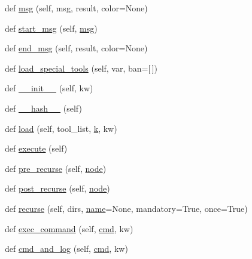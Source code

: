 \begin{DoxyCompactItemize}
def \hyperlink{classwaflib_1_1_context_1_1_context_a7495a2e04e528aa54bda3cadf08240cb}{msg} (self, msg, result, color=None)
\item 
def \hyperlink{classwaflib_1_1_context_1_1_context_a344a0dff2c7b0d2d76057d55b83c3f16}{start\+\_\+msg} (self, \hyperlink{classwaflib_1_1_context_1_1_context_a7495a2e04e528aa54bda3cadf08240cb}{msg})
\item 
def \hyperlink{classwaflib_1_1_context_1_1_context_a6340799a7fa4dc1230d13b7c08eec789}{end\+\_\+msg} (self, result, color=None)
\item 
def \hyperlink{classwaflib_1_1_context_1_1_context_a95a53e6c363450df77f847bec6c56696}{load\+\_\+special\+\_\+tools} (self, var, ban=\mbox{[}$\,$\mbox{]})
\item 
def \hyperlink{classwaflib_1_1_context_1_1_context_ab8fabf802b21a8a8e77c3e3811c58c84}{\+\_\+\+\_\+init\+\_\+\+\_\+} (self, kw)
\item 
def \hyperlink{classwaflib_1_1_context_1_1_context_ae8096e428213ed965d8cd5629c2481a1}{\+\_\+\+\_\+hash\+\_\+\+\_\+} (self)
\item 
def \hyperlink{classwaflib_1_1_context_1_1_context_ad214db6a7b3ce05051972f7d073a74f2}{load} (self, tool\+\_\+list, \hyperlink{rfft2d_test_m_l_8m_adc468c70fb574ebd07287b38d0d0676d}{k}, kw)
\item 
def \hyperlink{classwaflib_1_1_context_1_1_context_ae98aa77cb954743799c5b730c6775329}{execute} (self)
\item 
def \hyperlink{classwaflib_1_1_context_1_1_context_a290c81ad18ad9b3c0bcbde2d8fce519e}{pre\+\_\+recurse} (self, \hyperlink{structnode}{node})
\item 
def \hyperlink{classwaflib_1_1_context_1_1_context_ab818cd610ecc0c6fa981f0cde9f3dd13}{post\+\_\+recurse} (self, \hyperlink{structnode}{node})
\item 
def \hyperlink{classwaflib_1_1_context_1_1_context_a10e3b0d5e63bb03a0a7adbb32c3dceab}{recurse} (self, dirs, \hyperlink{lib_2expat_8h_a1b49b495b59f9e73205b69ad1a2965b0}{name}=None, mandatory=True, once=True)
\item 
def \hyperlink{classwaflib_1_1_context_1_1_context_aaa7d209a0d05f2f8e45fc11b83c72dba}{exec\+\_\+command} (self, \hyperlink{sndfile__play_8m_adfc5ba7e22f5e4a6221c12a70503bef3}{cmd}, kw)
\item 
def \hyperlink{classwaflib_1_1_context_1_1_context_aaa63c5a7ac60f1bf164febe6642d270f}{cmd\+\_\+and\+\_\+log} (self, \hyperlink{sndfile__play_8m_adfc5ba7e22f5e4a6221c12a70503bef3}{cmd}, kw)
\item 

\end{DoxyCompactItemize}

